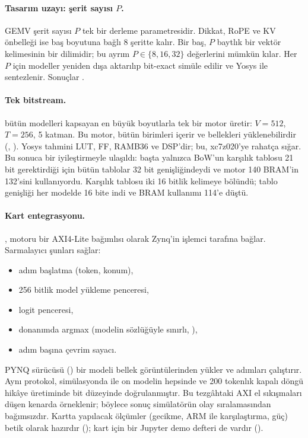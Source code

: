 \paragraph{Tasarım uzayı: şerit sayısı $P$.} GEMV şerit sayısı $P$ tek bir derleme parametresidir. Dikkat, RoPE ve KV
önbelleği ise baş boyutuna bağlı 8 şeritte kalır. Bir baş, $P$ baytlık bir vektör kelimesinin bir dilimidir; bu ayrım
$P\in\{8, 16, 32\}$ değerlerini mümkün kılar. Her $P$ için modeller yeniden dışa aktarılıp bit-exact simüle edilir ve
Yosys ile sentezlenir. Sonuçlar \zooDseNote.

\paragraph{Tek bitstream.}  bütün modelleri kapsayan en büyük boyutlarla tek bir motor
üretir: $V=512$, $T=256$, 5 katman. Bu motor, bütün birimleri içerir ve bellekleri yüklenebilirdir (,
). Yosys tahmini \zooUniLut{} LUT, \zooUniFf{} FF, \zooUniBram{} RAMB36 ve \zooUniDsp{} DSP'dir; bu,
xc7z020'ye rahatça sığar. Bu sonuca bir iyileştirmeyle ulaşıldı: başta yalnızca BoW'un karşılık tablosu 21 bit
gerektirdiği için bütün tablolar 32 bit genişliğindeydi ve motor 140 BRAM'in 132'sini kullanıyordu. Karşılık tablosu iki
16 bitlik kelimeye bölündü; tablo genişliği her modelde 16 bite indi ve BRAM kullanımı 114'e düştü.

\paragraph{Kart entegrasyonu.} , motoru bir AXI4-Lite bağımlısı olarak Zynq'in işlemci
tarafına bağlar. Sarmalayıcı şunları sağlar:
\begin{itemize}
  \item adım başlatma (token, konum),
  \item 256 bitlik model yükleme penceresi,
  \item logit penceresi,
  \item donanımda argmax (modelin sözlüğüyle sınırlı, ),
  \item adım başına çevrim sayacı.
\end{itemize}
PYNQ sürücüsü () bir modeli bellek görüntülerinden yükler ve adımları çalıştırır. Aynı
protokol, simülasyonda  ile on modelin hepsinde ve 200 tokenlık kapalı döngü hikâye üretiminde
bit düzeyinde doğrulanmıştır. Bu tezgâhtaki AXI el sıkışmaları düşen kenarda örneklenir; böylece sonuç simülatörün olay
sıralamasından bağımsızdır. Kartta yapılacak ölçümler (gecikme, ARM ile karşılaştırma, güç) betik olarak hazırdır
(); kart için bir Jupyter demo defteri de vardır ().

